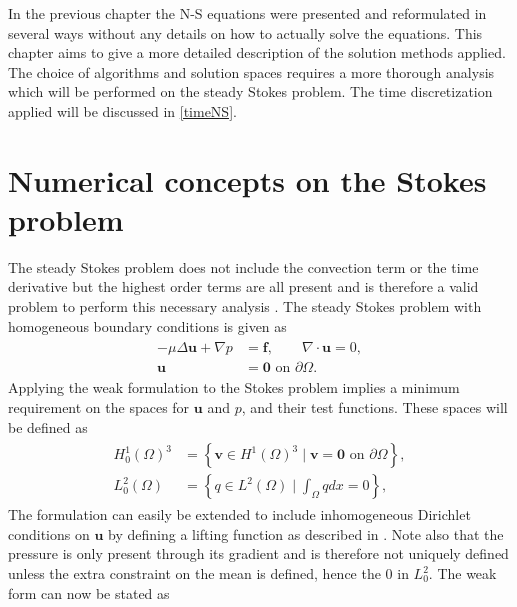 
In the previous chapter the N-S equations were presented and reformulated in several ways without any details on how to
actually solve the equations. This chapter aims to give a more detailed description of the solution methods applied.
The choice of algorithms and solution spaces requires a more thorough analysis which will be performed on the 
steady Stokes problem. The time discretization applied will be discussed in \cref{timeNS}.


\section{Numerical concepts on the Stokes problem} \label{stokes}
The steady Stokes problem does not include the convection term or the time derivative 
but the highest order terms are all present and is therefore a valid problem to perform this necessary
analysis \cite{Karniadakis}. The steady Stokes problem with homogeneous boundary conditions is given as 
%
\begin{align}
    \begin{split}
        - \mu \Delta \mathbf{u} + \nabla p &= \mathbf{f}, \qquad \nabla \cdot \mathbf{u} = 0, \\
        \mathbf{u} &= \mathbf{0} \text{  on  } \partial \Omega.
    \end{split}
    \label{eq:stokes}
\end{align}
%
Applying the weak formulation to the Stokes problem implies a minimum requirement on the spaces for $\mathbf{u}$ and $p$,
and their test functions. These spaces will be defined as 
%
\begin{align}
    \begin{split}
        H_0^1(\Omega)^{3} &= \left\{ \mathbf{v} \in H^1(\Omega)^{3}\; |
        \; \mathbf{v} = \mathbf{0} \text{  on  } \partial \Omega \right\},\\
    L_0^2(\Omega) &= \left\{ q \in L^2(\Omega)\; |\; \int_{\Omega} q dx = 0 \right\},
    \end{split}
    \label{eq:spaces}
\end{align}
%
The formulation can easily be extended to include inhomogeneous Dirichlet conditions on $\mathbf{u}$ by defining a 
lifting function as described in \cite{Quarteroni}. Note also that the pressure is only present through its gradient 
and is therefore not uniquely defined unless the extra constraint on the mean is defined, hence the $0$ in $L_0^2$. 
The weak form can now be stated as

